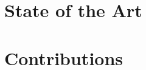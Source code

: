 \documentclass[12pt,a4paper]{report}
\begin{document}
\part{State of the Art}





\part{Contributions}



% 









\appendix

\end{document}
